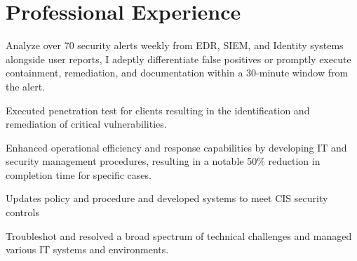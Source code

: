 
\section{Professional Experience}



\vspace{\topsep} %
\begin{tightitemize}
\item Analyze over 70 security alerts weekly from EDR, SIEM, and Identity systems alongside user reports, I adeptly differentiate false positives or promptly execute containment, remediation, and documentation within a  30-minute window from the alert.
\item Executed penetration test for clients resulting in the identification and remediation of critical vulnerabilities.
\item Enhanced operational efficiency and response capabilities by developing  IT and security management procedures, resulting in a notable 50\% reduction in completion time for specific cases.
\item Updates policy and procedure and developed systems to meet CIS security controls
\end{tightitemize}

\sectionspace %



\begin{tightitemize}
\item Troubleshot and resolved a broad spectrum of technical challenges and managed various IT systems and environments.
\end{tightitemize}


